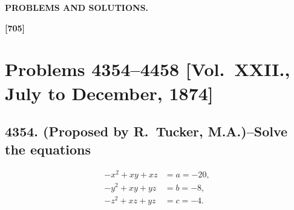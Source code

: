 \documentclass[11pt,a4paper]{article}
\theoremstyle{definition}
\begin{document}
\begin{center}
\Large\bfseries
PROBLEMS AND SOLUTIONS.
\end{center}

\thispagestyle{empty}

\vspace{1em}

\noindent\textbf{[705]}

\section*{Problems 4354--4458 [Vol.~XXII., July to December, 1874]}

\subsection*{4354. (Proposed by R.~Tucker, M.A.)\---Solve the equations}

\begin{align}
-x^2 + xy + xz &= a = -20, \\
-y^2 + xy + yz &= b = -8, \\
-z^2 + xz + yz &= c = -4.
\end{align}
\end{document}
